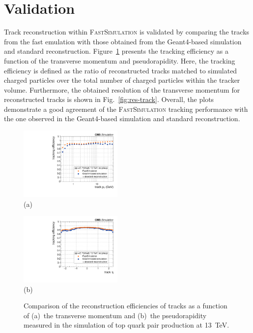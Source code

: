 \documentclass[a4paper]{jpconf}
\begin{document}
\section{Validation}

Track reconstruction within \textsc{FastSimulation} is validated by comparing the tracks from the fast emulation with those obtained from the Geant4-based simulation and standard reconstruction. Figure~\ref{fig:eff-tracks} presents the tracking efficiency as a function of the transverse momentum and pseudorapidity. Here, the tracking efficiency is defined as the ratio of reconstructed tracks matched to simulated charged particles over the total number of charged particles within the tracker volume. Furthermore, the obtained resolution of the transverse momentum for reconstructed tracks is shown in Fig.~\ref{fig:res-track}. Overall, the plots demonstrate a good agreement of the \textsc{FastSimulation} tracking performance with the one observed in the Geant4-based simulation and standard reconstruction.

\begin{figure}[htbp]
\begin{center}
\parbox{0.46\textwidth}{\centering\includegraphics[width=0.45\textwidth]{figures/eff_pt.pdf}\\(a)}
\hspace{0.05\textwidth}
\parbox{0.46\textwidth}{\centering\includegraphics[width=0.45\textwidth]{figures/eff_eta.pdf}\\(b)}
\caption{\label{fig:eff-tracks}Comparison of the reconstruction efficiencies of tracks as a function of (a)~the transverse momentum and (b)~the pseudorapidity measured in the simulation of top quark pair production at 13~TeV.}
\end{center}
\end{figure}
\end{document}
